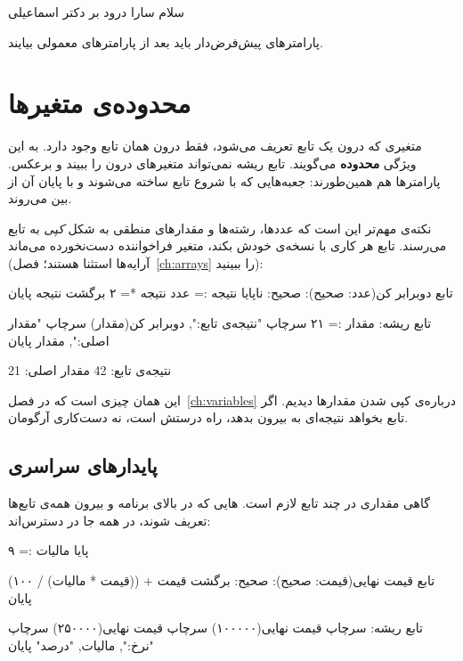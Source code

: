 \begin{outputfa}
سلام سارا
درود بر دکتر اسماعیلی
\end{outputfa}

پارامترهای پیش‌فرض‌دار باید بعد از پارامترهای معمولی بیایند.

\section{محدوده‌ی متغیرها}

متغیری که درون یک تابع تعریف می‌شود، فقط درون همان تابع وجود دارد. به
این ویژگی \textbf{محدوده} می‌گویند. تابع ریشه نمی‌تواند متغیرهای درون
 را ببیند و برعکس. پارامترها هم همین‌طورند: جعبه‌هایی که
با شروع تابع ساخته می‌شوند و با پایان آن از بین می‌روند.

نکته‌ی مهم‌تر این است که عددها، رشته‌ها و مقدارهای منطقی به شکل \emph{کپی}
به تابع می‌رسند. تابع هر کاری با نسخه‌ی خودش بکند، متغیر فراخواننده
دست‌نخورده می‌ماند (آرایه‌ها استثنا هستند؛ فصل~\ref{ch:arrays} را ببینید):

\begin{salamfa}
تابع دوبرابر کن(عدد: صحیح): صحیح:
    ناپایا نتیجه := عدد
    نتیجه *= ۲
    برگشت نتیجه
پایان

تابع ریشه:
    مقدار := ۲۱
    سرچاپ "نتیجه‌ی تابع:", دوبرابر کن(مقدار)
    سرچاپ "مقدار اصلی:", مقدار
پایان
\end{salamfa}

\begin{outputfa}
نتیجه‌ی تابع: 42
مقدار اصلی: 21
\end{outputfa}

این همان چیزی است که در فصل~\ref{ch:variables} درباره‌ی کپی شدن مقدارها
دیدیم. اگر تابع بخواهد نتیجه‌ای به بیرون بدهد، راه درستش 
است، نه دست‌کاری آرگومان.

\subsection{پایدارهای سراسری}

گاهی مقداری در چند تابع لازم است. ‌هایی که در بالای برنامه و
بیرون همه‌ی تابع‌ها تعریف شوند، در همه جا در دسترس‌اند:

\begin{salamfa}
پایا مالیات := ۹

تابع قیمت نهایی(قیمت: صحیح): صحیح:
    برگشت قیمت + ((قیمت * مالیات) / ۱۰۰)
پایان

تابع ریشه:
    سرچاپ قیمت نهایی(۱۰۰۰۰۰)
    سرچاپ قیمت نهایی(۲۵۰۰۰۰)
    سرچاپ "نرخ:", مالیات, "درصد"
پایان
\end{salamfa}

